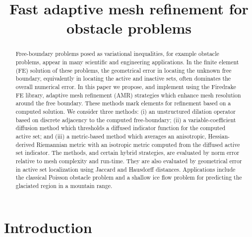 \documentclass[]{interact}
\theoremstyle{plain}%
\theoremstyle{definition}
\theoremstyle{remark}
\begin{document}

\title{Fast adaptive mesh refinement for obstacle problems}

\author{
}

\maketitle

\begin{abstract}
Free-boundary problems posed as variational inequalities, for example obstacle problems, appear in many scientific and engineering applications.  In the finite element (FE) solution of these problems, the geometrical error in locating the unknown free boundary, equivalently in locating the active and inactive sets, often dominates the overall numerical error.  In this paper we propose, and implement using the Firedrake FE library, adaptive mesh refinement (AMR) strategies which enhance mesh resolution around the free boundary.  These methods mark elements for refinement based on a computed solution.  We consider three methods: (i) an unstructured dilation operator based on discrete adjacency to the computed free-boundary; (ii) a variable-coefficient diffusion method which thresholds a diffused indicator function for the computed active set; and (iii) a metric-based method which averages an anisotropic, Hessian-derived Riemannian metric with an isotropic metric computed from the diffused active set indicator.  The methods, and certain hybrid strategies, are evaluated by norm error relative to mesh complexity and run-time.  They are also evaluated by geometrical error in active set localization using Jaccard and Hausdorff distances.  Applications include the classical Poisson obstacle problem and a shallow ice flow problem for predicting the glaciated region in a mountain range.
\end{abstract}



\section{Introduction} \label{sec:intro}
\end{document}
